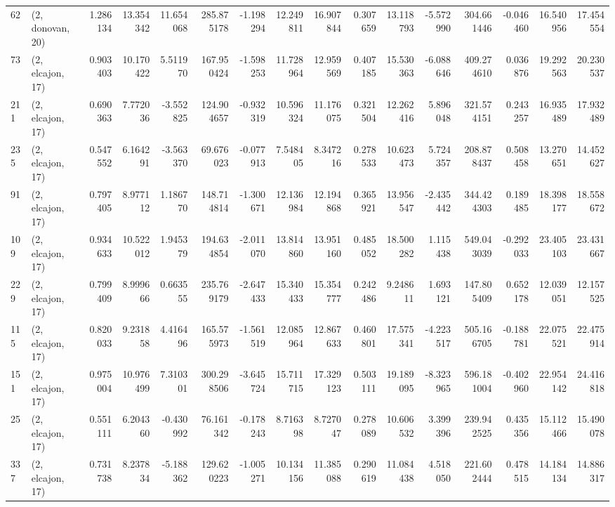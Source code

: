 \begin{tabular}{llrrrrrrrrrrrrrr}
62  &  (2, donovan, 20) &   1.286134 &  13.354342 &  11.654068 &   285.875178 &  -1.198294 &  12.249811 &  16.907844 &  0.307659 &  13.118793 &  -5.572990 &   304.661446 & -0.046460 &  16.540956 &  17.454554 \\
73  &  (2, elcajon, 17) &   0.903403 &  10.170422 &   5.511970 &   167.950424 &  -1.598253 &  11.728964 &  12.959569 &  0.407185 &  15.530363 &  -6.088646 &   409.274610 &  0.036876 &  19.292563 &  20.230537 \\
211 &  (2, elcajon, 17) &   0.690363 &   7.772036 &  -3.552825 &   124.904657 &  -0.932319 &  10.596324 &  11.176075 &  0.321504 &  12.262416 &   5.896048 &   321.574151 &  0.243257 &  16.935489 &  17.932489 \\
235 &  (2, elcajon, 17) &   0.547552 &   6.164291 &  -3.563370 &    69.676023 &  -0.077913 &   7.548405 &   8.347216 &  0.278533 &  10.623473 &   5.724357 &   208.878437 &  0.508458 &  13.270651 &  14.452627 \\
91  &  (2, elcajon, 17) &   0.797405 &   8.977112 &   1.186770 &   148.714814 &  -1.300671 &  12.136984 &  12.194868 &  0.365921 &  13.956547 &  -2.435442 &   344.424303 &  0.189485 &  18.398177 &  18.558672 \\
109 &  (2, elcajon, 17) &   0.934633 &  10.522012 &   1.945379 &   194.634854 &  -2.011070 &  13.814860 &  13.951160 &  0.485052 &  18.500282 &   1.115438 &   549.043039 & -0.292033 &  23.405103 &  23.431667 \\
229 &  (2, elcajon, 17) &   0.799409 &   8.999666 &   0.663555 &   235.769179 &  -2.647433 &  15.340433 &  15.354777 &  0.242486 &   9.248611 &   1.693121 &   147.805409 &  0.652178 &  12.039051 &  12.157525 \\
115 &  (2, elcajon, 17) &   0.820033 &   9.231858 &   4.416496 &   165.575973 &  -1.561519 &  12.085964 &  12.867633 &  0.460801 &  17.575341 &  -4.223517 &   505.166705 & -0.188781 &  22.075521 &  22.475914 \\
151 &  (2, elcajon, 17) &   0.975004 &  10.976499 &   7.310301 &   300.298506 &  -3.645724 &  15.711715 &  17.329123 &  0.503111 &  19.189095 &  -8.323965 &   596.181004 & -0.402960 &  22.954142 &  24.416818 \\
25  &  (2, elcajon, 17) &   0.551111 &   6.204360 &  -0.430992 &    76.161342 &  -0.178243 &   8.716398 &   8.727047 &  0.278089 &  10.606532 &   3.399396 &   239.942525 &  0.435356 &  15.112466 &  15.490078 \\
337 &  (2, elcajon, 17) &   0.731738 &   8.237834 &  -5.188362 &   129.620223 &  -1.005271 &  10.134156 &  11.385088 &  0.290619 &  11.084438 &   4.518050 &   221.602444 &  0.478515 &  14.184134 &  14.886317 \\

\end{tabular}
